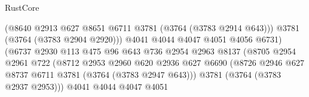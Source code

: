 \begin{lexlean}{RustCore}
\begin{coremodule}
                                              (@8640
                                                @2913
                                                @627
                                                @8651
                                                @6711
                                                @3781
                                                (@3764 (@3783 @2914 @643)))
                                              @3781
                                              (@3764 (@3783 @2904 @2920)))
                                            @4041
                                            @4044
                                            @4047
                                            @4051
                                            @4056
                                            @6731)
                                          (@6737
                                            @2930
                                            @113
                                            @475
                                            @96
                                            @643
                                            @736
                                            @2954
                                            @2963
                                            @8137
                                            (@8705
                                              @2954
                                              @2961
                                              @722
                                              (@8712
                                                @2953
                                                @2960
                                                @620
                                                @2936
                                                @627
                                                @6690
                                                (@8726
                                                  @2946
                                                  @627
                                                  @8737
                                                  @6711
                                                  @3781
                                                  (@3764 (@3783 @2947 @643)))
                                                @3781
                                                (@3764 (@3783 @2937 @2953)))
                                              @4041
                                              @4044
                                              @4047
                                              @4051

\end{coremodule}
\end{lexlean}
